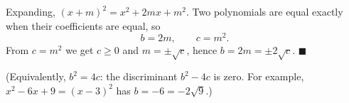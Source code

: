 Expanding, $(x+m)^2=x^2+2mx+m^2$. Two polynomials are equal exactly when their coefficients are equal, so
\[
b=2m,\qquad c=m^2 .
\]
From $c=m^2$ we get $c\ge0$ and $m=\pm\sqrt c$, hence $b=2m=\pm2\sqrt c$. $\blacksquare$

(Equivalently, $b^2=4c$: the discriminant $b^2-4c$ is zero. For example, $x^2-6x+9=(x-3)^2$ has $b=-6=-2\sqrt9$.)
